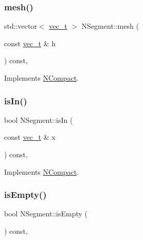 \mbox{\label{class_n_segment_ad89a4122b800b15f465f5ca776394721}} 
\subsubsection{\texorpdfstring{mesh()}{mesh()}\hspace{0.1cm}{\footnotesize\ttfamily [2/2]}}
{\footnotesize\ttfamily std\+::vector$<$ \mbox{\hyperlink{_n_vector_8h_a0a2cfc67e738a3d73e4f12098c4c07f6}{vec\+\_\+t}} $>$ N\+Segment\+::mesh (\begin{DoxyParamCaption}\item[{const \mbox{\hyperlink{_n_vector_8h_a0a2cfc67e738a3d73e4f12098c4c07f6}{vec\+\_\+t}} \&}]{h }\end{DoxyParamCaption}) const\hspace{0.3cm}{\ttfamily [override]}, {\ttfamily [virtual]}}



Implements \mbox{\hyperlink{class_n_compact_ad4cdc60c75ca433c63f44ec13063e2fe}{N\+Compact}}.

\mbox{\label{class_n_segment_a9370351370e57d265f990b3e9d2ab114}} 
\subsubsection{\texorpdfstring{isIn()}{isIn()}}
{\footnotesize\ttfamily bool N\+Segment\+::is\+In (\begin{DoxyParamCaption}\item[{const \mbox{\hyperlink{_n_vector_8h_a0a2cfc67e738a3d73e4f12098c4c07f6}{vec\+\_\+t}} \&}]{x }\end{DoxyParamCaption}) const\hspace{0.3cm}{\ttfamily [override]}, {\ttfamily [virtual]}}



Implements \mbox{\hyperlink{class_n_compact_a387e86914973c69b292782f640368680}{N\+Compact}}.

\mbox{\label{class_n_segment_ac17e9542c20477269bbcf08286d79d07}} 
\subsubsection{\texorpdfstring{isEmpty()}{isEmpty()}}
{\footnotesize\ttfamily bool N\+Segment\+::is\+Empty (\begin{DoxyParamCaption}{ }\end{DoxyParamCaption}) const\hspace{0.3cm}{\ttfamily [override]}, {\ttfamily [virtual]}}



